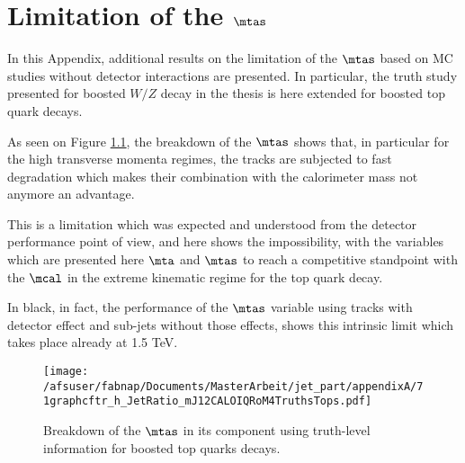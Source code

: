 \chapter{Limitation of the $\mtas$}

In this Appendix, additional results on the limitation of the $\mtas$ based on MC studies without detector interactions are presented. In particular, the truth study presented for boosted $W/Z$ decay in the thesis is here extended for boosted top quark decays.

As seen on Figure \ref{fig:breakdown3}, the breakdown of the $\mtas$ shows that, in particular for the high transverse momenta regimes, the tracks are subjected to fast degradation which makes their combination with the calorimeter mass not anymore an advantage. 

This is a limitation which was expected and understood from the detector performance point of view, and here shows the impossibility, with the variables which are presented here $\mta$ and $\mtas$ to reach a competitive standpoint with the $\mcal$ in the extreme kinematic regime for the top quark decay.

In black, in fact, the performance of the $\mtas$ variable using tracks with detector effect and sub-jets without those effects, shows this intrinsic limit which takes place already at 1.5 TeV.

\begin{figure}[!ht]
  \centering
      \texttt{[image: /afsuser/fabnap/Documents/MasterArbeit/jet\_part/appendixA/71graphcftr\_h\_JetRatio\_mJ12CALOIQRoM4TruthsTops.pdf]}
  \caption[Breakdown of the $\mtas$ ]{Breakdown of the $\mtas$ in its component using truth-level information for boosted top quarks decays.}
  \label{fig:breakdown3}
\end{figure}
